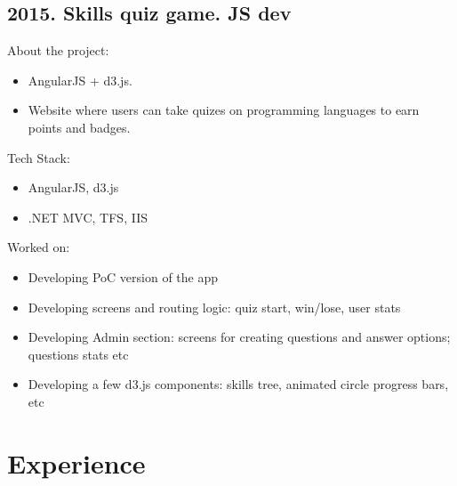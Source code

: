 \documentclass[a4paper, 14pt]{article}
\begin{document}
  \subsection{2015. Skills quiz game. JS dev}
    About the project:
    \begin{itemize}
      \item AngularJS + d3.js. \\
      \item Website where users can take quizes on programming languages to earn points and badges. \\
    \end{itemize}
    Tech Stack:
    \begin{itemize}
      \item AngularJS, d3.js \\
      \item .NET MVC, TFS, IIS \\
    \end{itemize}
    Worked on: 
    \begin{itemize}
      \item Developing PoC version of the app \\
      \item Developing screens and routing logic: quiz start, win/lose, user stats \\
      \item Developing Admin section: screens for creating questions and answer options; questions stats etc \\
      \item Developing a few d3.js components: skills tree, animated circle progress bars, etc \\
    \end{itemize}

\section{Experience}
\end{document}
